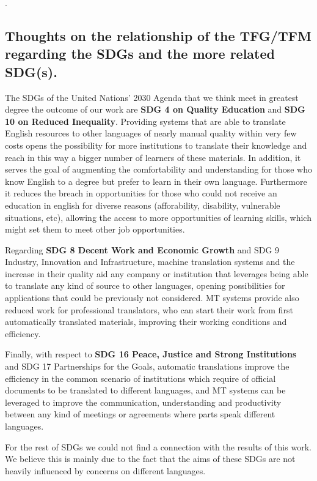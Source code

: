 \documentclass[11pt]{article}
\begin{document}
\newpage
.

\vspace{5ex}

\subsection*{Thoughts on the relationship of the TFG/TFM regarding the SDGs and the more related SDG(s).}


The SDGs of the United Nations' 2030 Agenda that we think meet in greatest degree the outcome of our work are \textbf{SDG 4 on Quality Education} and \textbf{SDG 10 on Reduced Inequality}. Providing systems that are able to translate English resources to other languages of nearly manual quality within very few costs opens the possibility for more institutions to translate their knowledge and reach in this way a bigger number of learners of these materials. In addition, it serves the goal of augmenting the comfortability and understanding for those who know English to a degree but prefer to learn in their own language. Furthermore it reduces the breach in opportunities for those who could not receive an education in english for diverse reasons (afforability, disability, vulnerable situations, etc), allowing the access to more opportunities of learning skills, which might set them to meet other job opportunities. 

\vspace{2ex}
Regarding \textbf{SDG 8 Decent Work and Economic Growth} and {SDG 9 Industry, Innovation and Infrastructure}, machine translation systems and the increase in their quality aid any company or institution that leverages being able to translate any kind of source to other languages, opening possibilities for applications that could be previously not considered. MT systems provide also reduced work for professional translators, who can start their work from first automatically translated materials, improving their working conditions and efficiency.
\vspace{2ex}

Finally, with respect to \textbf{SDG 16 Peace, Justice and Strong Institutions} and {SDG 17 Partnerships for the Goals}, automatic translations improve the efficiency in the common scenario of institutions which require of official documents to be translated to different languages, and  MT systems can be leveraged to improve the communication, understanding and productivity between any kind of meetings or agreements where parts speak different languages.
\vspace{2ex}


For the rest of SDGs we could not find a connection with the results of this work. We believe this is mainly due to the fact that the aims of these SDGs are not heavily influenced by concerns on different languages.
\vspace{1ex}
\end{document}
